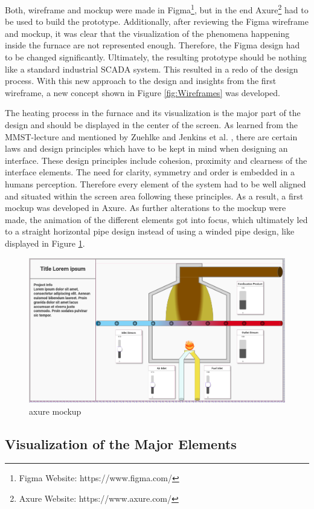 Both, wireframe and mockup were made in Figma\footnote{Figma Website: https://www.figma.com/}, but in the end Axure\footnote{Axure Website: https://www.axure.com/} had to be used to build the prototype. Additionally, after reviewing the Figma wireframe and mockup, it was clear that the visualization of the phenomena happening inside the furnace are not represented enough. Therefore, the Figma design had to be changed significantly. Ultimately, the resulting prototype should be nothing like a standard industrial \ac{SCADA} system. This resulted in a redo of the design process. With this new approach to the design and insights from the first wireframe, a new concept shown in Figure \ref{fig:Wireframes} was developed.

The heating process in the furnace and its visualization is the major part of the design and should be displayed in the center of the screen. As learned from the \ac{MMST}-lecture and mentioned by Zuehlke\cite{Zhlke2012NutzergerechteEV} and Jenkins et al. \cite{Jenkins2013}, there are certain laws and design principles which have to be kept in mind when designing an interface. These design principles include cohesion, proximity and clearness of the interface elements. The need for clarity, symmetry and order is embedded in a humans perception. Therefore every element of the system had to be well aligned and situated within the screen area following these principles. As a result, a first mockup was developed in Axure. As further alterations to the mockup were made, the animation of the different elements got into focus, which ultimately led to a straight horizontal pipe design instead of using a winded pipe design, like displayed in Figure \ref{fig:axurewiremockup}.

   
\begin{figure}[ht]
    \centering
    \includegraphics[width=0.6\linewidth]{images/concept/mockup/mockup_v3_axure.png}
    \caption{axure mockup}
    \label{fig:axurewiremockup}
\end{figure}

\subsection*{Visualization of the Major Elements}

